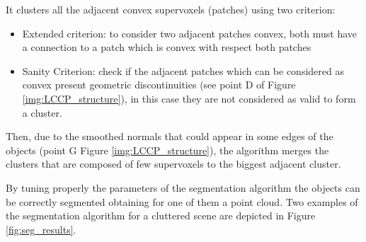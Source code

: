 It clusters all the adjacent convex supervoxels (patches) using two criterion:
\begin{itemize}
\item Extended criterion: to consider two adjacent patches convex, both must have a connection to a patch which is convex with respect both patches
\item Sanity Criterion: check if the adjacent patches which can be considered as convex present geometric discontinuities (see point D of Figure \ref{img:LCCP_structure}), in this case they are not considered as valid to form a cluster.
\end{itemize}
Then, due to the smoothed normals that could appear in some edges of the objects (point G Figure \ref{img:LCCP_structure}), the algorithm merges the clusters that are composed of few supervoxels to the biggest adjacent cluster. 

By tuning properly the parameters of the segmentation algorithm the objects can be correctly segmented obtaining for one of them a point cloud. Two examples of the segmentation algorithm for a cluttered scene are depicted in Figure \ref{fig:seg_results}. 

